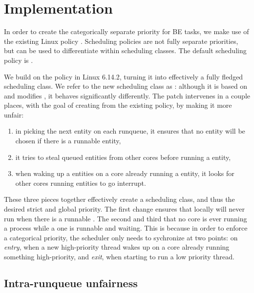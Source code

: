 \section{Implementation}\label{s:implementation}

In order to create the categorically separate priority for BE tasks, we make use
of the existing Linux policy \schedidle{}. Scheduling policies are not fully
separate priorities, but can be used to differentiate within scheduling classes.
The default scheduling policy is \schednormal{}.

We build on the \schedidle{} policy in Linux 6.14.2, turning it into effectively
a fully fledged scheduling class. We refer to the new scheduling class as
\schedbe{}: although it is based on and modifies \schedidle{}, it behaves
significantly differently. The patch intervenes in a couple places, with the
goal of creating \schedbe{} from the existing \schedidle{} policy, by making it
more unfair: 
\begin{enumerate}
    \item in picking the next entity on each runqueue, it ensures that no
\schedbe{} entity will be chosen if there is a runnable \schednormal{} entity,
    \item it tries to steal queued \schednormal{} entities from other cores
before running a \schedbe{} entity,
    \item when waking up a \schednormal{} entities on a core already running a
    \schednormal{} entity, it looks for other cores running \schedbe{}
    entities to go interrupt.
\end{enumerate}

These three pieces together effectively create a scheduling class, and thus the
desired strict and global priority. The first change ensures that locally
\schedbe{} will never run when there is a runnable \schednormal{}. The second
and third that no core is ever running a \schedbe{} process while a
\schednormal{} one is runnable and waiting. This is because in order to enforce
a categorical priority, the scheduler only needs to sychronize at two points: on
\textit{entry}, when a new high-priority thread wakes up on a core already
running something high-priority, and \textit{exit}, when starting to run a low
priority thread.

\subsection{Intra-runqueue unfairness}

